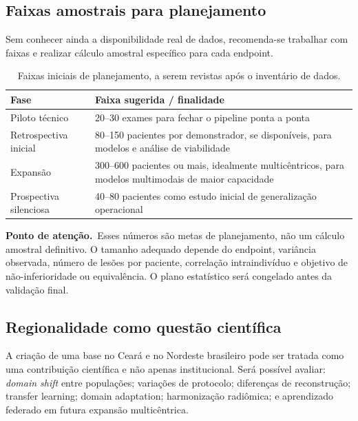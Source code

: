 \documentclass[11pt,a4paper]{article}
\newcommand{\atencao}{\textcolor{titleblue}{\textbf{Ponto de atenção.}}\ }
\begin{document}
\subsection{Faixas amostrais para planejamento}

Sem conhecer ainda a disponibilidade real de dados, recomenda-se trabalhar com faixas e realizar cálculo amostral específico para cada endpoint.

\begin{table}[htbp]
\centering
\caption{Faixas iniciais de planejamento, a serem revistas após o inventário de dados.}
\begin{tabular}{p{4.2cm}p{9.3cm}}
\toprule
\textbf{Fase} & \textbf{Faixa sugerida / finalidade}\\
\midrule
Piloto técnico & 20--30 exames para fechar o pipeline ponta a ponta\\
Retrospectiva inicial & 80--150 pacientes por demonstrador, se disponíveis, para modelos e análise de viabilidade\\
Expansão & 300--600 pacientes ou mais, idealmente multicêntricos, para modelos multimodais de maior capacidade\\
Prospectiva silenciosa & 40--80 pacientes como estudo inicial de generalização operacional\\
\bottomrule
\end{tabular}
\end{table}

\begin{caixa}
\atencao Esses números são metas de planejamento, não um cálculo amostral definitivo. O tamanho adequado depende do endpoint, variância observada, número de lesões por paciente, correlação intraindivíduo e objetivo de não-inferioridade ou equivalência. O plano estatístico será congelado antes da validação final.
\end{caixa}

\subsection{Regionalidade como questão científica}

A criação de uma base no Ceará e no Nordeste brasileiro pode ser tratada como uma contribuição científica e não apenas institucional. Será possível avaliar: \emph{domain shift} entre populações; variações de protocolo; diferenças de reconstrução; transfer learning; domain adaptation; harmonização radiômica; e aprendizado federado em futura expansão multicêntrica.
\end{document}

